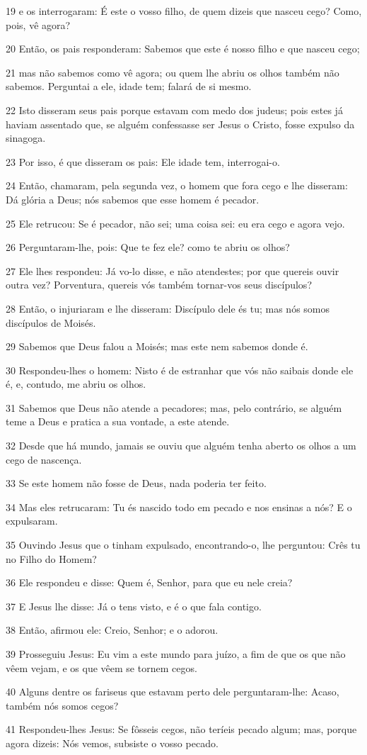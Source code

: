 \par 19 e os interrogaram: É este o vosso filho, de quem dizeis que nasceu cego? Como, pois, vê agora?
\par 20 Então, os pais responderam: Sabemos que este é nosso filho e que nasceu cego;
\par 21 mas não sabemos como vê agora; ou quem lhe abriu os olhos também não sabemos. Perguntai a ele, idade tem; falará de si mesmo.
\par 22 Isto disseram seus pais porque estavam com medo dos judeus; pois estes já haviam assentado que, se alguém confessasse ser Jesus o Cristo, fosse expulso da sinagoga.
\par 23 Por isso, é que disseram os pais: Ele idade tem, interrogai-o.
\par 24 Então, chamaram, pela segunda vez, o homem que fora cego e lhe disseram: Dá glória a Deus; nós sabemos que esse homem é pecador.
\par 25 Ele retrucou: Se é pecador, não sei; uma coisa sei: eu era cego e agora vejo.
\par 26 Perguntaram-lhe, pois: Que te fez ele? como te abriu os olhos?
\par 27 Ele lhes respondeu: Já vo-lo disse, e não atendestes; por que quereis ouvir outra vez? Porventura, quereis vós também tornar-vos seus discípulos?
\par 28 Então, o injuriaram e lhe disseram: Discípulo dele és tu; mas nós somos discípulos de Moisés.
\par 29 Sabemos que Deus falou a Moisés; mas este nem sabemos donde é.
\par 30 Respondeu-lhes o homem: Nisto é de estranhar que vós não saibais donde ele é, e, contudo, me abriu os olhos.
\par 31 Sabemos que Deus não atende a pecadores; mas, pelo contrário, se alguém teme a Deus e pratica a sua vontade, a este atende.
\par 32 Desde que há mundo, jamais se ouviu que alguém tenha aberto os olhos a um cego de nascença.
\par 33 Se este homem não fosse de Deus, nada poderia ter feito.
\par 34 Mas eles retrucaram: Tu és nascido todo em pecado e nos ensinas a nós? E o expulsaram.
\par 35 Ouvindo Jesus que o tinham expulsado, encontrando-o, lhe perguntou: Crês tu no Filho do Homem?
\par 36 Ele respondeu e disse: Quem é, Senhor, para que eu nele creia?
\par 37 E Jesus lhe disse: Já o tens visto, e é o que fala contigo.
\par 38 Então, afirmou ele: Creio, Senhor; e o adorou.
\par 39 Prosseguiu Jesus: Eu vim a este mundo para juízo, a fim de que os que não vêem vejam, e os que vêem se tornem cegos.
\par 40 Alguns dentre os fariseus que estavam perto dele perguntaram-lhe: Acaso, também nós somos cegos?
\par 41 Respondeu-lhes Jesus: Se fôsseis cegos, não teríeis pecado algum; mas, porque agora dizeis: Nós vemos, subsiste o vosso pecado.


